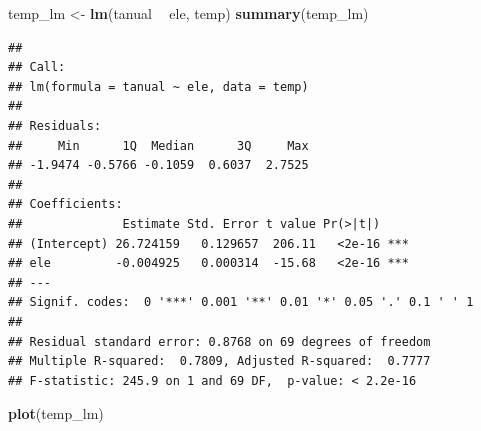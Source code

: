 \documentclass[11pt,]{article}
\newenvironment{Shaded}{\begin{snugshade}}{\end{snugshade}}
\newcommand{\KeywordTok}[1]{\textcolor[rgb]{0.13,0.29,0.53}{\textbf{#1}}}
\newcommand{\StringTok}[1]{\textcolor[rgb]{0.31,0.60,0.02}{#1}}
\newcommand{\OperatorTok}[1]{\textcolor[rgb]{0.81,0.36,0.00}{\textbf{#1}}}
\newcommand{\NormalTok}[1]{#1}
\begin{document}
\begin{Shaded}
\begin{Highlighting}[]
\NormalTok{temp_lm <-}\StringTok{ }\KeywordTok{lm}\NormalTok{(tanual }\OperatorTok{~}\StringTok{ }\NormalTok{ele, temp)}
\KeywordTok{summary}\NormalTok{(temp_lm)}
\end{Highlighting}
\end{Shaded}

\begin{verbatim}
## 
## Call:
## lm(formula = tanual ~ ele, data = temp)
## 
## Residuals:
##     Min      1Q  Median      3Q     Max 
## -1.9474 -0.5766 -0.1059  0.6037  2.7525 
## 
## Coefficients:
##              Estimate Std. Error t value Pr(>|t|)    
## (Intercept) 26.724159   0.129657  206.11   <2e-16 ***
## ele         -0.004925   0.000314  -15.68   <2e-16 ***
## ---
## Signif. codes:  0 '***' 0.001 '**' 0.01 '*' 0.05 '.' 0.1 ' ' 1
## 
## Residual standard error: 0.8768 on 69 degrees of freedom
## Multiple R-squared:  0.7809, Adjusted R-squared:  0.7777 
## F-statistic: 245.9 on 1 and 69 DF,  p-value: < 2.2e-16
\end{verbatim}

\begin{Shaded}
\begin{Highlighting}[]
\KeywordTok{plot}\NormalTok{(temp_lm)}
\end{Highlighting}
\end{Shaded}
\end{document}
